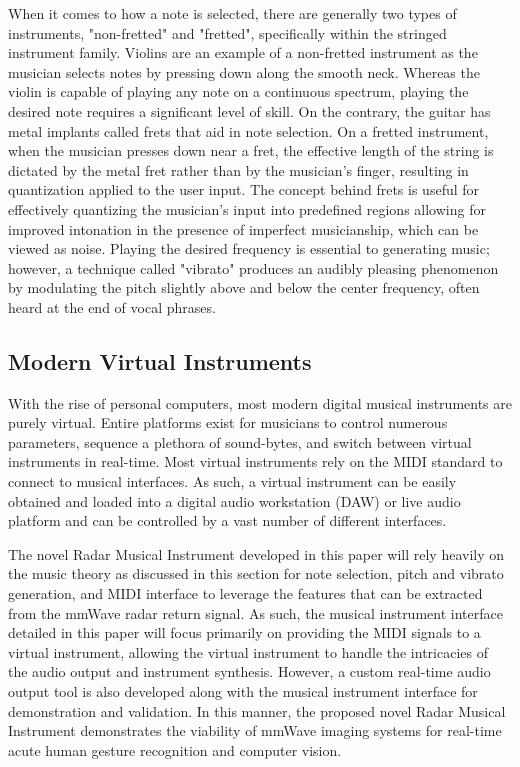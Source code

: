 \documentclass[10pt,journal,final]{IEEEtran}
\begin{document}
When it comes to how a note is selected, there are generally two types of instruments, "non-fretted" and "fretted", specifically within the stringed instrument family. Violins are an example of a non-fretted instrument as the musician selects notes by pressing down along the smooth neck. Whereas the violin is capable of playing any note on a continuous spectrum, playing the desired note requires a significant level of skill. On the contrary, the guitar has metal implants called frets that aid in note selection. On a fretted instrument, when the musician presses down near a fret, the effective length of the string is dictated by the metal fret rather than by the musician's finger, resulting in quantization applied to the user input. The concept behind frets is useful for effectively quantizing the musician's input into predefined regions allowing for improved intonation in the presence of imperfect musicianship, which can be viewed as noise. Playing the desired frequency is essential to generating music; however, a technique called "vibrato" produces an audibly pleasing phenomenon by modulating the pitch slightly above and below the center frequency, often heard at the end of vocal phrases. 

\subsection{Modern Virtual Instruments}
\label{subsec:modern_virtual_instruments}
With the rise of personal computers, most modern digital musical instruments are purely virtual. Entire platforms exist for musicians to control numerous parameters, sequence a plethora of sound-bytes, and switch between virtual instruments in real-time. Most virtual instruments rely on the MIDI standard to connect to musical interfaces. As such, a virtual instrument can be easily obtained and loaded into a digital audio workstation (DAW) or live audio platform and can be controlled by a vast number of different interfaces. 

The novel Radar Musical Instrument developed in this paper will rely heavily on the music theory as discussed in this section for note selection, pitch and vibrato generation, and MIDI interface to leverage the features that can be extracted from the mmWave radar return signal. As such, the musical instrument interface detailed in this paper will focus primarily on providing the MIDI signals to a virtual instrument, allowing the virtual instrument to handle the intricacies of the audio output and instrument synthesis. However, a custom real-time audio output tool is also developed along with the musical instrument interface for demonstration and validation. In this manner, the proposed novel Radar Musical Instrument demonstrates the viability of mmWave imaging systems for real-time acute human gesture recognition and computer vision.
\end{document}
